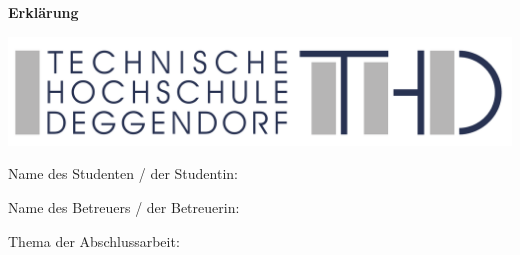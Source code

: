 \thispagestyle{empty}
\newcommand{\signature}[1]{%
\bigskip
\noindent
\begin{tabular*}{\linewidth}{lp{3cm}p{1cm} p{6cm}}
Deggendorf, & \dotfill & & \dotfill \\
& {\footnotesize Datum} & & {\centering \footnotesize #1}
\end{tabular*}
}

\begin{minipage}[b]{.5\linewidth}
	\Large\textbf{Erklärung}
\end{minipage}
\begin{minipage}[b]{.5\linewidth}
	\includegraphics[width=\linewidth]{THD_Logo.pdf}
\end{minipage}

\bigskip

Name des Studenten / der Studentin: \quad \student

\bigskip
Name des Betreuers / der Betreuerin: \quad \supervisor

\vspace{.7cm}
Thema der Abschlussarbeit:

\vspace{.5em}
{\def\\{\relax\ifhmode\unskip\fi\space\ignorespaces}
\thesistitleDE
}\dotfill

\vspace{.5em}
\dotfill

\vspace{.5em}
\dotfill

\vspace{.5em}
\dotfill

